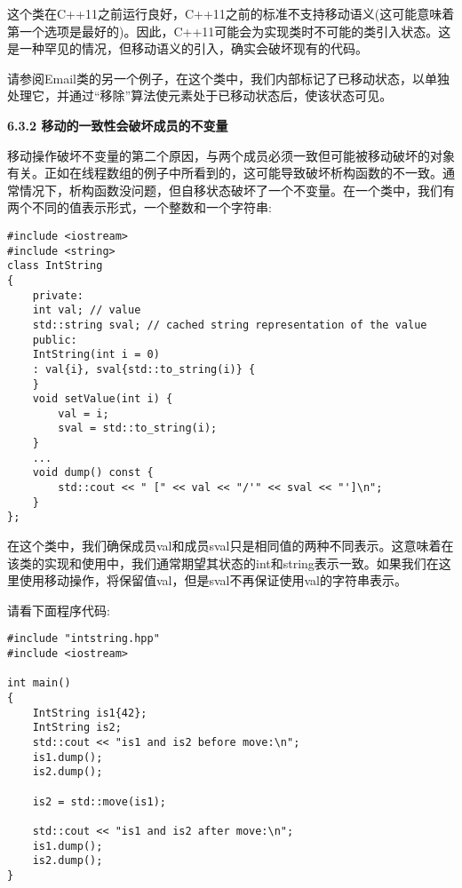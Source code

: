 这个类在C++11之前运行良好，C++11之前的标准不支持移动语义(这可能意味着第一个选项是最好的)。因此，C++11可能会为实现类时不可能的类引入状态。这是一种罕见的情况，但移动语义的引入，确实会破坏现有的代码。\par

请参阅Email类的另一个例子，在这个类中，我们内部标记了已移动状态，以单独处理它，并通过“移除”算法使元素处于已移动状态后，使该状态可见。\par

\hspace*{\fill} \par %
\textbf{6.3.2 移动的一致性会破坏成员的不变量}

移动操作破坏不变量的第二个原因，与两个成员必须一致但可能被移动破坏的对象有关。正如在线程数组的例子中所看到的，这可能导致破坏析构函数的不一致。通常情况下，析构函数没问题，但自移状态破坏了一个不变量。在一个类中，我们有两个不同的值表示形式，一个整数和一个字符串:\par

{\color{red}{basics/intstring.hpp}}

\begin{lstlisting}[caption={}]
#include <iostream>
#include <string>
class IntString
{
	private:
	int val; // value
	std::string sval; // cached string representation of the value
	public:
	IntString(int i = 0)
	: val{i}, sval{std::to_string(i)} {
	}
	void setValue(int i) {
		val = i;
		sval = std::to_string(i);
	}
	...
	void dump() const {
		std::cout << " [" << val << "/'" << sval << "']\n";
	}
};
\end{lstlisting}

在这个类中，我们确保成员val和成员sval只是相同值的两种不同表示。这意味着在该类的实现和使用中，我们通常期望其状态的int和string表示一致。如果我们在这里使用移动操作，将保留值val，但是sval不再保证使用val的字符串表示。\par

请看下面程序代码:\par

{\color{red}{basics/intstring.cpp}}\par

\begin{lstlisting}[caption={}]
#include "intstring.hpp"
#include <iostream>

int main()
{
	IntString is1{42};
	IntString is2;
	std::cout << "is1 and is2 before move:\n";
	is1.dump();
	is2.dump();
	
	is2 = std::move(is1);
	
	std::cout << "is1 and is2 after move:\n";
	is1.dump();
	is2.dump();
}
\end{lstlisting}

